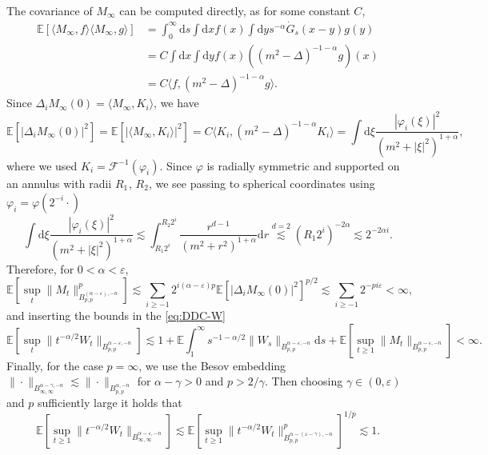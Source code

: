 \documentclass[11pt, a4paper]{scrartcl}
\numberwithin{equation}{section}
\theoremstyle{plain}
\theoremstyle{remark}
\newcommand{\mathd}{\mathrm{d}}
\begin{document}
The covariance of $M_{\infty}$ can be computed directly, as for some constant
$C$,
\[ \begin{aligned}
		\mathbb{E} [\langle M_{\infty}, f \rangle \langle M_{\infty}, g \rangle]
		 & = \int_0^{\infty} \mathd s \int \mathd x f (x) \int \mathd y s^{-
		\alpha} \dot{G}_s (x - y) g (y)                                         \\
		 & = C \int \mathd x \int \mathd y f (x) ((m^2 - \Delta)^{- 1 - \alpha}
		g) (x)                                                                  \\
		 & = C \langle f, (m^2 - \Delta)^{- 1 - \alpha} g \rangle .
	\end{aligned} \]
Since $\Delta_i M_{\infty} (0) = \langle M_{\infty}, K_i \rangle$, we have
\[ \mathbb{E} [| \Delta_i M_{\infty} (0) |^2] =\mathbb{E} [| \langle
		M_{\infty}, K_i \rangle |^2] = C \langle K_i, (m^2 - \Delta)^{- 1 - \alpha}
	K_i \rangle = \int \mathd \xi \frac{| \varphi_i (\xi) |^2}{(m^2 + | \xi
		|^2)^{1 + \alpha}}, \]
where we used $K_i = \mathcal{F}^{- 1} (\varphi_i)$. Since $\varphi$ is
radially symmetric and supported on an annulus with radii ${R_1}_{}$, $R_2$,
we see passing to spherical coordinates using $\varphi_i = \varphi (2^{- i}
	\cdot)$
\[ \int \mathd \xi \frac{| \varphi_i (\xi) |^2}{(m^2 + | \xi |^2)^{1 +
				\alpha}} \lesssim \int_{R_1  2^i}^{R_2 2^i} \frac{r^{d - 1}}{(m^2 + r^2)^{1
				+ \alpha}} \mathd r \overset{d = 2}{\lesssim} (R_1 2^i)^{- 2 \alpha}
	\lesssim 2^{- 2 \alpha i} . \]
Therefore, for $0 < \alpha < \varepsilon$,
\[ \mathbb{E} [\sup_t \| M_t \|^p_{B^{(\alpha - \varepsilon), - n}_{p, p}}]
	\lesssim \sum_{i \geqslant - 1} 2^{i (\alpha - \varepsilon) p} \mathbb{E}
	[| \Delta_i M_{\infty} (0) |^2]^{p / 2} \lesssim \sum_{i \geqslant - 1}
	2^{- pi \varepsilon} < \infty, \]
and inserting the bounds in the \eqref{eq:DDC-W}
{\small\[ \mathbb{E} [\sup_t  \| t^{- \alpha / 2} W_t \|_{B_{p, p}^{\alpha -
							\varepsilon, - n}}] \lesssim 1 +\mathbb{E} \int_1^{\infty} s^{- 1 - \alpha
				/ 2} \| W_s \|_{B_{p, p}^{\alpha - \varepsilon, - n}} \mathd s +\mathbb{E}
		[\sup_{t \geqslant 1} \| M_t \|_{B_{p, p}^{\alpha - \varepsilon, - n}}] < \infty . \]}
Finally, for the case $p = \infty$, we use the Besov embedding $\| \cdot
	\|_{B^{\alpha - \gamma, - n}_{\infty, \infty}} \lesssim \| \cdot \|_{B_{p,
					p}^{\alpha, - n}}$ for $\alpha - \gamma > 0$ and $p > 2 / \gamma$. Then
choosing $\gamma \in (0, \varepsilon)$ and $p$ sufficiently large it holds
that
\[ \mathbb{E} [\sup_{t \geqslant 1} \| t^{- \alpha / 2} W_t
		\|_{B_{\infty, \infty}^{\alpha - \varepsilon, - n}}] \lesssim
	\mathbb{E} [\sup_{t \geqslant 1}  \| t^{- \alpha / 2} W_t \|_{B_{p,
						p}^{\alpha - (\varepsilon - \gamma), - n}}^p]^{1 / p} \lesssim 1. \]
\end{document}
